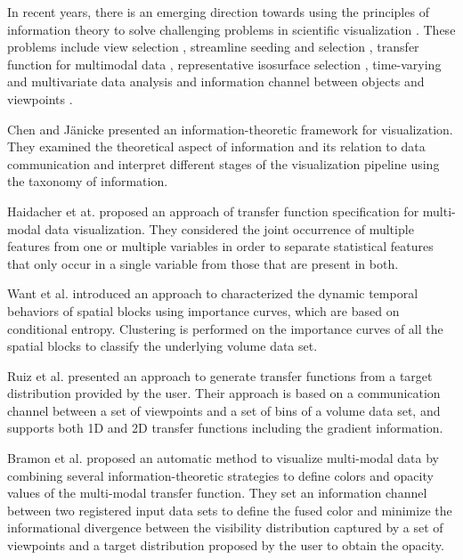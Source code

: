 In recent years, there is an emerging direction towards using the principles of information theory to solve challenging problems in scientific visualization \cite{wang_information_2011}. These problems include view selection \cite{bordoloi_view_2005} \cite{takahashi_feature-driven_2005} \cite{feixas_unified_2009}, streamline seeding and selection \cite{xu_information-theoretic_2010} \cite{lee_view_2011}, transfer function for multimodal data \cite{bramon_multimodal_2012}, representative isosurface selection \cite{wang_lod_2006}, time-varying and multivariate data analysis \cite{wang_importance-driven_2008} and information channel between objects and viewpoints \cite{ruiz_viewpoint_2010}.

Chen and J{\"a}nicke \cite{chen_information-theoretic_2010} presented an information-theoretic framework for visualization. They examined the theoretical aspect of information and its relation to data communication and interpret different stages of the visualization pipeline using the taxonomy of information.

Haidacher et at. \cite{haidacher_information-based_2008} proposed an approach of transfer function specification for multi-modal data visualization. They considered the joint occurrence of multiple features from one or multiple variables in order to separate statistical features that only occur in a single variable from those that are present in both.

Want et al. \cite{wang_importance-driven_2008} introduced an approach to characterized the dynamic temporal behaviors of spatial blocks using importance curves, which are based on conditional entropy. Clustering is performed on the importance curves of all the spatial blocks to classify the underlying volume data set.

Ruiz et al. \cite{ruiz_automatic_2011} presented an approach to generate transfer functions from a target distribution provided by the user. Their approach is based on a communication channel between a set of viewpoints and a set of bins of a volume data set, and supports both 1D and 2D transfer functions including the gradient information.

Bramon et al. \cite{bramon_information_2013} proposed an automatic method to visualize multi-modal data by combining several information-theoretic strategies to define colors and opacity values of the multi-modal transfer function.
They set an information channel between two registered input data sets to define the fused color and minimize the informational divergence between the visibility distribution captured by a set of viewpoints and a target distribution proposed by the user to obtain the opacity.

